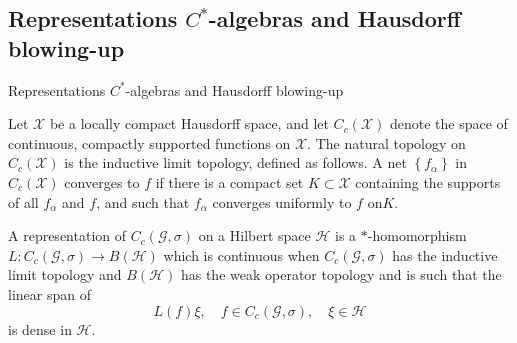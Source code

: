 \documentclass{beamer}
\theoremstyle{plain}
\newcommand{\G}{\mathcal{G}}
\newcommand{\sX}{\mathcal{X}}       %
\renewcommand{\a}{\alpha}
\renewcommand{\H}{\mathcal{H}}               %
\begin{document}
\subsection{Representations $C^*$-algebras and Hausdorff blowing-up}
\begin{frame}
		\huge Representations $C^*$-algebras and Hausdorff blowing-up \normalsize\\
	\begin{definition}
		
		Let $\sX$ be a locally compact Hausdorff space, and let $C_c\left(\sX\right)$ denote the	space of continuous, compactly supported functions on $\sX$. The natural	topology on $C_c\left(\sX\right)$ is the \alert{inductive limit topology}, defined as follows. A net	$\left\{f_\a\right\}$ in $C_c\left(\sX\right)$ converges to $f$ if there is a compact set $K\subset\sX$ containing	the supports of all $f_\a$ and $f$, and such that $f_\a$ converges uniformly to $f$ on$K$.
	\end{definition}
	
	\begin{definition}\label{groupoid_representation_defn}
		A \alert{representation} of $C_c\left(\G, \sigma\right)$ on a Hilbert space $\H$ is a $*$-homomorphism $L : C_c\left(\G, \sigma\right) \to B\left(\H \right)$ which is continuous when $C_c\left(\G, \sigma\right)$ has the inductive limit 
		topology  and $B\left(\H \right)$ has the weak operator topology  and is such that the linear  span of
		$$
		L\left(f \right) \xi , \quad f \in C_c\left(\G, \sigma\right), \quad \xi \in \H
		$$
		is dense in $\H$.
	\end{definition}
	
	
\end{frame}
\end{document}
